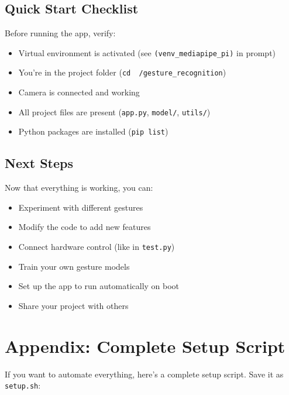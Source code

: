 \documentclass[12pt,a4paper]{article}
\begin{document}
\subsection{Quick Start Checklist}

Before running the app, verify:
\begin{itemize}
    \item[$\square$] Virtual environment is activated (see \texttt{(venv\_mediapipe\_pi)} in prompt)
    \item[$\square$] You're in the project folder (\texttt{cd ~/gesture\_recognition})
    \item[$\square$] Camera is connected and working
    \item[$\square$] All project files are present (\texttt{app.py}, \texttt{model/}, \texttt{utils/})
    \item[$\square$] Python packages are installed (\texttt{pip list})
\end{itemize}

\subsection{Next Steps}

Now that everything is working, you can:
\begin{itemize}
    \item Experiment with different gestures
    \item Modify the code to add new features
    \item Connect hardware control (like in \texttt{test.py})
    \item Train your own gesture models
    \item Set up the app to run automatically on boot
    \item Share your project with others
\end{itemize}

\section{Appendix: Complete Setup Script}

If you want to automate everything, here's a complete setup script. Save it as \texttt{setup.sh}:
\end{document}
